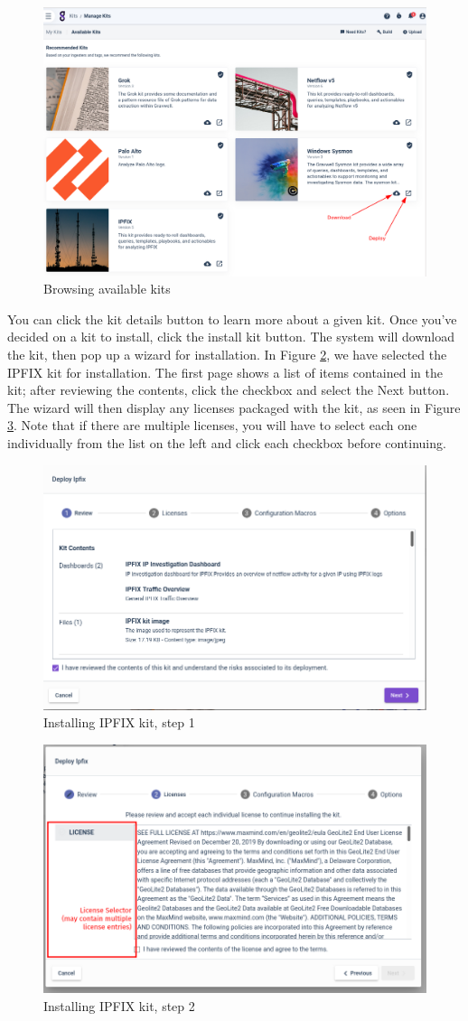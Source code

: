 \begin{figure}
	\includegraphics[width=0.85\linewidth]{images/available-kits.png}
	\caption{Browsing available kits}
	\label{fig:available-kits}
\end{figure}

You can click the kit details button to learn more about a given kit. Once you've decided on a kit to install, click the install kit button. The system will download the kit, then pop up a wizard for installation. In Figure \ref{fig:wizard1}, we have selected the IPFIX kit for installation. The first page shows a list of items contained in the kit; after reviewing the contents, click the checkbox and select the Next button. The wizard will then display any licenses packaged with the kit, as seen in Figure \ref{fig:wizard2}. Note that if there are multiple licenses, you will have to select each one individually from the list on the left and click each checkbox before continuing.

\begin{figure}
	\includegraphics[width=0.6\linewidth]{images/wizard1.png}
	\caption{Installing IPFIX kit, step 1}
	\label{fig:wizard1}
\end{figure}

\begin{figure}
	\includegraphics[width=0.6\linewidth]{images/wizard2.png}
	\caption{Installing IPFIX kit, step 2}
	\label{fig:wizard2}
\end{figure}

